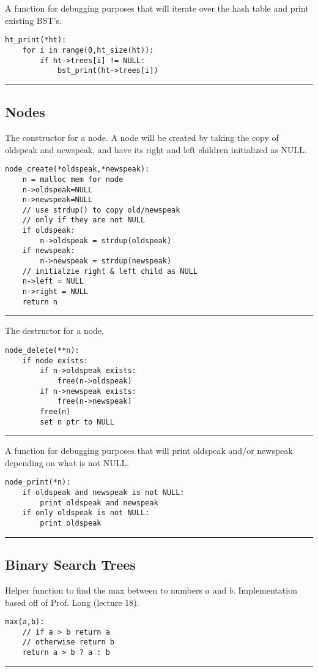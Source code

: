 \documentclass[
	12pt, %
]{fphw}
\begin{document}
A function for debugging purposes that will iterate over the hash table and print existing BST's.
\begin{lstlisting}[mathescape=true]
ht_print(*ht):
	for i in range(0,ht_size(ht)):
		if ht->trees[i] != NULL:
			bst_print(ht->trees[i])
\end{lstlisting}
\noindent\rule{6.3in}{0.4pt}

\subsection{Nodes}

The constructor for a node. A node will be created by taking the copy of oldspeak and newspeak, and have its right and left children initialized as NULL.
\begin{lstlisting}[mathescape=true]
node_create(*oldspeak,*newspeak):
	n = malloc mem for node
	n->oldspeak=NULL
	n->newspeak=NULL
	// use strdup() to copy old/newspeak
	// only if they are not NULL
	if oldspeak:
		n->oldspeak = strdup(oldspeak)
	if newspeak:
		n->newspeak = strdup(newspeak)
	// initialzie right & left child as NULL
	n->left = NULL
	n->right = NULL
	return n
\end{lstlisting}
\noindent\rule{6.3in}{0.4pt}

The destructor for a node.
\begin{lstlisting}[mathescape=true]
node_delete(**n):
	if node exists:
		if n->oldspeak exists:
			free(n->oldspeak)
		if n->newspeak exists:
			free(n->newspeak)
		free(n)
		set n ptr to NULL
\end{lstlisting}
\noindent\rule{6.3in}{0.4pt}

A function for debugging purposes that will print oldspeak and/or newspeak depending on what is not NULL.
\begin{lstlisting}[mathescape=true]
node_print(*n):
	if oldspeak and newspeak is not NULL:
		print oldspeak and newspeak
	if only oldspeak is not NULL:
		print oldspeak
\end{lstlisting}
\noindent\rule{6.3in}{0.4pt}

\subsection{Binary Search Trees}

Helper function to find the max between to numbers $a$ and $b$. Implementation based off of Prof. Long (lecture 18).
\begin{lstlisting}[mathescape=true]
max(a,b):
	// if a > b return a
	// otherwise return b
	return a > b ? a : b
\end{lstlisting}
\noindent\rule{6.3in}{0.4pt}
\end{document}
